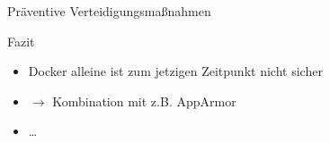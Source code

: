 \begin{frame}{Präventive Verteidigungsmaßnahmen}
        \begin{block}{Fazit}
                \begin{itemize}[<+->]
                        \item Docker alleine ist zum jetzigen Zeitpunkt nicht sicher
                        \item $\rightarrow$ Kombination mit z.B. AppArmor
                        \item \dots
                \end{itemize}
        \end{block}
\end{frame}

